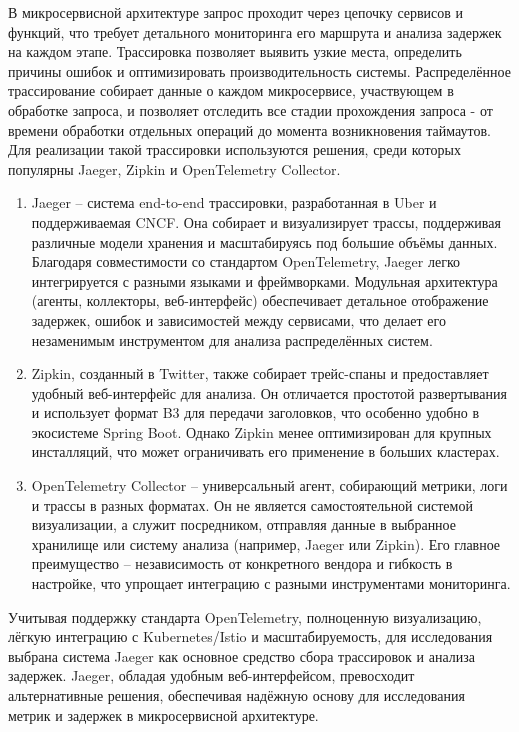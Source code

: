 В микросервисной архитектуре запрос проходит через цепочку сервисов и функций, что требует детального мониторинга его маршрута и анализа задержек на каждом этапе. Трассировка позволяет выявить узкие места, определить причины ошибок и оптимизировать производительность системы. Распределённое трассирование собирает данные о каждом микросервисе, участвующем в обработке запроса, и позволяет отследить все стадии прохождения запроса - от времени обработки отдельных операций до момента возникновения таймаутов. Для реализации такой трассировки используются решения, среди которых популярны Jaeger, Zipkin и OpenTelemetry Collector.
    \begin{enumerate}
    \item Jaeger\cite{jaeger} – система end-to-end трассировки, разработанная в Uber и поддерживаемая CNCF. Она собирает и визуализирует трассы, поддерживая различные модели хранения и масштабируясь под большие объёмы данных. Благодаря совместимости со стандартом OpenTelemetry, Jaeger легко интегрируется с разными языками и фреймворками. Модульная архитектура (агенты, коллекторы, веб-интерфейс) обеспечивает детальное отображение задержек, ошибок и зависимостей между сервисами, что делает его незаменимым инструментом для анализа распределённых систем.
    
    \item Zipkin\cite{Zipkin}, созданный в Twitter, также собирает трейс-спаны и предоставляет удобный веб-интерфейс для анализа. Он отличается простотой развертывания и использует формат B3 для передачи заголовков, что особенно удобно в экосистеме Spring Boot. Однако Zipkin менее оптимизирован для крупных инсталляций, что может ограничивать его применение в больших кластерах\cite{Borges_2021}.
    
    \item OpenTelemetry Collector\cite{otelcollector} – универсальный агент, собирающий метрики, логи и трассы в разных форматах. Он не является самостоятельной системой визуализации, а служит посредником, отправляя данные в выбранное хранилище или систему анализа (например, Jaeger или Zipkin). Его главное преимущество – независимость от конкретного вендора и гибкость в настройке, что упрощает интеграцию с разными инструментами мониторинга.
    \end{enumerate}

    Учитывая поддержку стандарта OpenTelemetry, полноценную визуализацию, лёгкую интеграцию с Kubernetes/Istio и масштабируемость, для исследования выбрана система Jaeger как основное средство сбора трассировок и анализа задержек. Jaeger, обладая удобным веб-интерфейсом, превосходит альтернативные решения, обеспечивая надёжную основу для исследования метрик  и задержек в микросервисной архитектуре.


